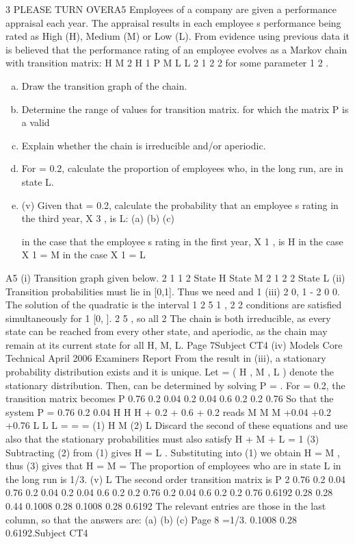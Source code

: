 \documentclass[a4paper,12pt]{article}
\begin{document}

 3
PLEASE TURN OVERA5
Employees of a company are given a performance appraisal each year. The appraisal
results in each employee s performance being rated as High (H), Medium (M) or Low
(L). From evidence using previous data it is believed that the performance rating of an
employee evolves as a Markov chain with transition matrix:
H
M
2
H 1
P
M
L
L
2
1 2
2
for some parameter
1
2
.
\begin{enumerate}[(a)]
\item Draw the transition graph of the chain. 
\item Determine the range of values for
transition matrix. 
for which the matrix P is a valid
\item Explain whether the chain is irreducible and/or aperiodic.
\item For = 0.2, calculate the proportion of employees who, in the long run, are in
state L.

\item (v) Given that = 0.2, calculate the probability that an employee s rating in the
third year, X 3 , is L:
(a)
(b)
(c)

in the case that the employee s rating in the first year, X 1 , is H
in the case X 1 = M
in the case X 1 = L
\end{enumerate}

A5
(i)
Transition graph given below.
2
1
1 2
State H
State M
2
1
2
2
State L
(ii)
Transition probabilities must lie in [0,1]. Thus we need
and 1
(iii)
2
0, 1 - 2
0
0.
The solution of the quadratic is the interval 1
2
5 1
,
2
2
conditions are satisfied simultaneously for 1
[0, ].
2
5
, so all
2
The chain is both irreducible, as every state can be reached from every other
state, and aperiodic, as the chain may remain at its current state for all H, M,
L.
Page 7Subject CT4
(iv)
Models Core Technical
April 2006
Examiners Report
From the result in (iii), a stationary probability distribution exists and it is
unique. Let = ( H , M , L ) denote the stationary distribution. Then, can be
determined by solving P = .
For
= 0.2, the transition matrix becomes
P
0.76 0.2 0.04
0.2
0.04 0.6
0.2 0.2
0.76
So that the system P =
0.76
0.2
0.04
H
H
H
+ 0.2
+ 0.6
+ 0.2
reads
M
M
M
+0.04
+0.2
+0.76
L
L
L
=
=
=
(1)
H
M
(2)
L
Discard the second of these equations and use also that the stationary
probabilities must also satisfy
H
+
M
+
L
= 1
(3)
Subtracting (2) from (1) gives
H
=
L .
Substituting into (1) we obtain H = M , thus (3) gives that H = M =
The proportion of employees who are in state L in the long run is 1/3.
(v)
L
The second order transition matrix is
P
2
0.76 0.2 0.04 0.76 0.2 0.04
0.2
0.04 0.6
0.2 0.2
0.76 0.2
0.04 0.6
0.2 0.2
0.76
0.6192 0.28
0.28
0.44
0.1008 0.28
0.1008
0.28
0.6192
The relevant entries are those in the last column, so that the answers are:
(a)
(b)
(c)
Page 8
=1/3.
0.1008
0.28
0.6192.Subject CT4
\end{document}
